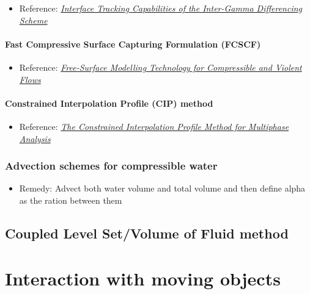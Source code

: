 \documentclass[]{report}
\begin{document}
\begin{itemize}
    \item Reference: \textit{\href{http://powerlab.fsb.hr/ped/kturbo/openfoam/docs/InterTrack.pdf}{Interface Tracking Capabilities of the Inter-Gamma Differencing Scheme}}
\end{itemize}

\subsubsection{Fast Compressive Surface Capturing Formulation (FCSCF)}

\begin{itemize}
    \item Reference: \textit{\href{http://researchspace.csir.co.za/dspace/bitstream/10204/5282/1/Heyns_2011.pdf}{Free-Surface Modelling Technology for Compressible and Violent Flows}}
\end{itemize}

\subsubsection{Constrained Interpolation Profile (CIP) method}


\begin{itemize}
    \item Reference: \textit{\href{http://www.mech.titech.ac.jp/~ryuutai/paper/JCP2001CIPReviewYabe.pdf}{The Constrained Interpolation Profile Method for Multiphase Analysis}}
\end{itemize}

\subsection{Advection schemes for compressible water}

\begin{itemize}
    \item Remedy: Advect both water volume and total volume and then define alpha as the ration between them
\end{itemize}

\section{Coupled Level Set/Volume of Fluid  method}

\chapter{Interaction with moving objects}
\end{document}
